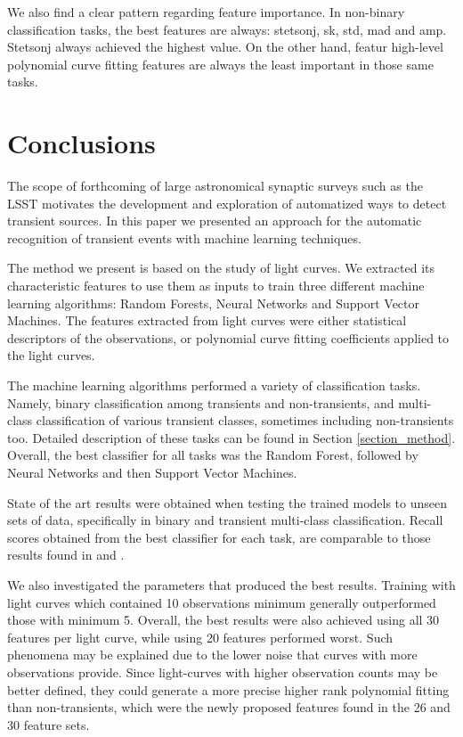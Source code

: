 \documentclass[a4paper,fleqn,usenatbib]{mnras}
\begin{document}
We also find a clear pattern regarding feature importance. 
In non-binary classification tasks, the best features are always:
stetson\textunderscore j, sk, std, mad and amp. 
Stetson\textunderscore j always achieved the highest value. 
On the other hand, featur high-level polynomial curve fitting features
are always the least important in those same tasks. 


\section{Conclusions}

The scope of forthcoming of large astronomical synaptic surveys such
as the LSST \citep{0805.2366} motivates the development and
exploration of automatized ways to detect transient sources.
In this paper we presented an approach for the automatic recognition
of transient events with machine learning techniques.   

The method we present is based on the study of light curves. 
We extracted its characteristic features to use them as inputs
to train three different machine learning algorithms: Random Forests,
Neural Networks and Support Vector Machines.
The features extracted from light curves were either statistical
descriptors of the observations, or polynomial curve fitting
coefficients applied to the light curves.   

The machine learning algorithms performed a variety of classification tasks.
Namely, binary classification among transients and non-transients, and
multi-class classification of various transient classes, sometimes
including non-transients too. Detailed description of these tasks can
be found in Section \ref{section_method}.  
Overall, the best classifier for all tasks was the Random Forest,
followed by Neural Networks and then Support Vector Machines. 

State of the art results were obtained when testing the trained models
to unseen sets of data, specifically in binary and transient
multi-class classification. 
Recall scores obtained from the best classifier for each task, are
comparable to those results found in \cite{1401.3211}
and \cite{1601.03931}.   


We also investigated the parameters that produced the best results.
Training with light curves which contained 10 observations minimum
generally outperformed those with minimum 5. 
Overall, the best results were also achieved using all 30 features per
light curve, while using 20 features performed worst. 
Such phenomena may be explained due to the lower noise that curves
with more observations provide.  
Since light-curves with higher observation counts may be better
defined, they could generate a more precise higher rank polynomial
fitting than non-transients, which were the newly proposed features
found in the 26 and 30 feature sets. 
\end{document}
